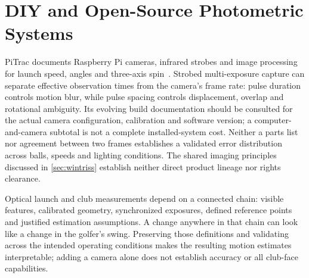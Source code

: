 \section{DIY and Open-Source Photometric Systems}
\label{sec:diy}

PiTrac documents Raspberry Pi cameras, infrared strobes and image processing for launch speed, angles and three-axis spin~\cite{pitrac}.
Strobed multi-exposure capture can separate effective observation times from the camera's frame rate: pulse duration controls motion blur, while pulse spacing controls displacement, overlap and rotational ambiguity.
Its evolving build documentation should be consulted for the actual camera configuration, calibration and software version; a computer-and-camera subtotal is not a complete installed-system cost.
Neither a parts list nor agreement between two frames establishes a validated error distribution across balls, speeds and lighting conditions.
The shared imaging principles discussed in \cref{sec:wintriss} establish neither direct product lineage nor rights clearance.

\begin{implication}
Optical launch and club measurements depend on a connected chain: visible features, calibrated geometry, synchronized exposures, defined reference points and justified estimation assumptions.
A change anywhere in that chain can look like a change in the golfer's swing.
Preserving those definitions and validating across the intended operating conditions makes the resulting motion estimates interpretable; adding a camera alone does not establish accuracy or all club-face capabilities.
\end{implication}
